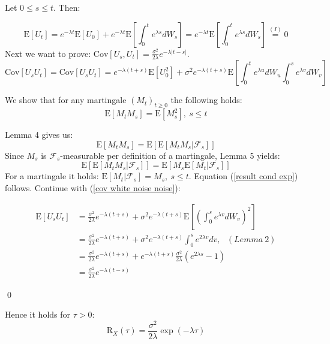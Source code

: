 \documentclass[%
thesis=student,%
coverpage=false,%
titlepage=false,%
headmarks=true, %
english,%
font=libertine, %
math=newpxtx, %
BCOR=5mm,%
coverBCOR=11mm%
]{tumbook}
\begin{document}
Let $0 \leq s \leq t$. Then:

\[
\mathrm{E}[U_{t}] = e^{-\lambda t}\mathrm{E}[U_{0}] + e^{-\lambda t}\mathrm{E}[\int_{0}^{t} e^{\lambda s} dW_{s}] = e^{-\lambda t}\mathrm{E}[\int_{0}^{t} e^{\lambda s} dW_{s}] \stackrel{(I)}{=}  0
\]
Next we want to prove: $\mathrm{Cov}[U_{s},U_{t}] = \frac{\sigma^2}{2\lambda}e^{-\lambda \lvert t-s \rvert}$. 
\begin{equation}
    \mathrm{Cov}[U_{s}U_{t}]=\mathrm{Cov}[U_{s}U_{t}] = e^{-\lambda(t+s)}\mathrm{E}[U_{0}^{2}] + \sigma^2 e^{-\lambda(t+s)} \mathrm{E}[\int_{0}^{t}e^{\lambda u}dW_{u}\int_{0}^{s}e^{\lambda v}dW_{v}]
    \label{cov white noise noise}
\end{equation}

We show that for any martingale $(M_{t})_{t \geq 0}$ the following holds: 
\begin{equation}
    \mathrm{E}[M_{t}M_{s}] = \mathrm{E}[M_{s}^{2}], \ s \leq t
    \label{result cond exp}
\end{equation}

Lemma 4 gives us:
\[
\mathrm{E}[M_{t}M_{s}] = \mathrm{E}[\mathrm{E}[M_{t}M_{s}|\mathcal{F}_{s}]]
\]
Since $M_{s}$ is $\mathcal{F}_{s}$-measurable per definition of a martingale, Lemma 5 yields:
\[
\mathrm{E}[\mathrm{E}[M_{t}M_{s}|\mathcal{F}_{s}]] = \mathrm{E}[M_{s}\mathrm{E}[M_{t}|\mathcal{F}_{s}]]
\]
For a martingale it holds: $\mathrm{E}[M_{t}|\mathcal{F}_{s}] = M_{s}, \ s \leq t$. Equation (\ref{result cond exp}) follows. Continue with (\ref{cov white noise noise}):


\begin{subequations}
    \begin{align*}
        \mathrm{E}[U_{s}U_{t}] &= \frac{\sigma^2}{2\lambda}e^{-\lambda(t+s)} + \sigma^2 e^{-\lambda(t+s)}\mathrm{E}[(\int_{0}^{s}e^{\lambda v}dW_{v})^{2}]   \\
         &= \frac{\sigma^2}{2\lambda}e^{-\lambda(t+s)} + \sigma^2 e^{-\lambda(t+s)}\int_{0}^{s}e^{2\lambda v}dv, \ \ \ (Lemma \ 2) \\
         &= \frac{\sigma^2}{2\lambda}e^{-\lambda(t+s)} + e^{-\lambda(t+s)}\frac{\sigma^2}{2\lambda}(e^{2\lambda s} - 1) \\
         &= \frac{\sigma^2}{2\lambda}e^{-\lambda(t-s)} 
    \end{align*}
\end{subequations}   

\qed

Hence it holds for $\tau > 0$:
\[
\mathrm{R}_{X}(\tau) =  \frac{\sigma^2}{2\lambda}\exp(-\lambda\tau)
\]
\end{document}
